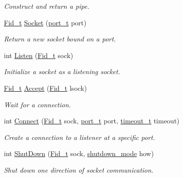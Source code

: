 \begin{DoxyCompactItemize}
\begin{DoxyCompactList}\small\item\em Construct and return a pipe. \end{DoxyCompactList}\item 
\hyperlink{group__syscalls_ga5097222c5f0da97d92d4712359abc38f}{Fid\+\_\+t} \hyperlink{group__syscalls_gadf167321edde68e905173d8056d3eb2f}{Socket} (\hyperlink{group__syscalls_ga13894e5a2ffd5febb7aeb90e87239d61}{port\+\_\+t} port)
\begin{DoxyCompactList}\small\item\em Return a new socket bound on a port. \end{DoxyCompactList}\item 
int \hyperlink{group__syscalls_ga9ff5bae3e7b9e5bbf5a788a5ff739bf7}{Listen} (\hyperlink{group__syscalls_ga5097222c5f0da97d92d4712359abc38f}{Fid\+\_\+t} sock)
\begin{DoxyCompactList}\small\item\em Initialize a socket as a listening socket. \end{DoxyCompactList}\item 
\hyperlink{group__syscalls_ga5097222c5f0da97d92d4712359abc38f}{Fid\+\_\+t} \hyperlink{group__syscalls_ga8116ee944d1b03b6fb2fdba59b57d4a8}{Accept} (\hyperlink{group__syscalls_ga5097222c5f0da97d92d4712359abc38f}{Fid\+\_\+t} lsock)
\begin{DoxyCompactList}\small\item\em Wait for a connection. \end{DoxyCompactList}\item 
int \hyperlink{group__syscalls_ga747ceadd43e9a4c72b08fffbadaefbdd}{Connect} (\hyperlink{group__syscalls_ga5097222c5f0da97d92d4712359abc38f}{Fid\+\_\+t} sock, \hyperlink{group__syscalls_ga13894e5a2ffd5febb7aeb90e87239d61}{port\+\_\+t} port, \hyperlink{group__syscalls_gaf412159e5cef839836a5e7b19ee75d1c}{timeout\+\_\+t} timeout)
\begin{DoxyCompactList}\small\item\em Create a connection to a listener at a specific port. \end{DoxyCompactList}\item 
int \hyperlink{group__syscalls_ga61d49d63d8c0f9fc0917cc1bda6fdfcb}{Shut\+Down} (\hyperlink{group__syscalls_ga5097222c5f0da97d92d4712359abc38f}{Fid\+\_\+t} sock, \hyperlink{group__syscalls_ga9eb10a0a72ca3149140272e9344a272b}{shutdown\+\_\+mode} how)
\begin{DoxyCompactList}\small\item\em Shut down one direction of socket communication. \end{DoxyCompactList}\item 

\end{DoxyCompactItemize}
